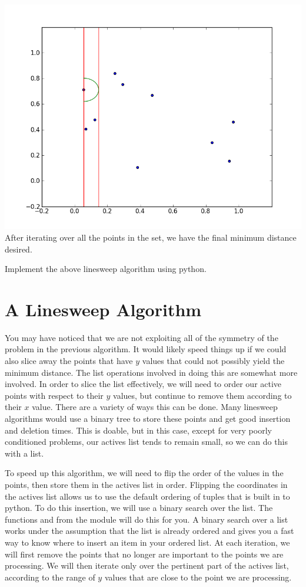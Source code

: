 \includegraphics[width = \textwidth]{simple8.png}
After iterating over all the points in the set, we have the final minimum distance desired.

\begin{problem}
Implement the above linesweep algorithm using python.
\end{problem}

\section*{A Linesweep Algorithm}

You may have noticed that we are not exploiting all of the symmetry of the problem in the previous algorithm. 
It would likely speed things up if we could also slice away the points that have $y$ values that could not possibly yield the minimum distance. 
The list operations involved in doing this are somewhat more involved. 
In order to slice the list effectively, we will need to order our active points with respect to their $y$ values, but continue to remove them according to their $x$ value. 
There are a variety of ways this can be done. 
Many linesweep algorithms would use a binary tree to store these points and get good insertion and deletion times. 
This is doable, but in this case, except for very poorly conditioned problems, our actives list tends to remain small, so we can do this with a list. 

To speed up this algorithm, we will need to flip the order of the values in the points, then store them in the actives list in order. 
Flipping the coordinates in the actives list allows us to use the default ordering of tuples that is built in to python. 
To do this insertion, we will use a binary search over the list. 
The functions  and  from the  module will do this for you. 
A binary search over a list works under the assumption that the list is already ordered and gives you a fast way to know where to insert an item in your ordered list. 
At each iteration, we will first remove the points that no longer are important to the points we are processing. 
We will then iterate only over the pertinent part of the actives list, according to the range of $y$ values that are close to the point we are processing.

